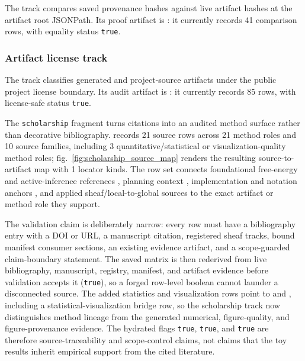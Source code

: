 \documentclass[
  english,
]{article}
\begin{document}
The  track compares saved provenance hashes
against live artifact hashes at the artifact root JSONPath. Its proof
artifact is : it
currently records 41 comparison rows, with equality status
\texttt{true}.

\subsubsection{Artifact license track}\label{artifact-license-track}

The  track classifies generated and
project-source artifacts under the public project license boundary. Its
audit artifact is :
it currently records 85 rows, with license-safe status \texttt{true}.

The \texttt{scholarship} fragment turns citations into an audited method
surface rather than decorative bibliography.
 records 21 source
rows across 21 method roles and 10 source families, including 3
quantitative/statistical or visualization-quality method roles;
fig.~\ref{fig:scholarship_source_map} renders the resulting
source-to-artifact map with 1 locator kinds. The row set connects
foundational free-energy and active-inference references
\citep{friston2010fep, buckley2017mathreview, dacosta2020discrete, parr2022active, smith2022tutorial},
planning context \citep{champion2021branching, nuijten2026efeplanning},
implementation and notation anchors \citep{pymdp2024, gnn2023}, and
applied sheaf/local-to-global sources
\citep{curry2014sheaves, robinson2014topological, bosca2026localglobal}
to the exact artifact or method role they support.

The validation claim is deliberately narrow: every row must have a
bibliography entry with a DOI or URL, a manuscript citation, registered
sheaf tracks, bound manifest consumer sections, an existing evidence
artifact, and a scope-guarded claim-boundary statement. The saved matrix
is then rederived from live bibliography, manuscript, registry,
manifest, and artifact evidence before validation accepts it
(\texttt{true}), so a forged row-level boolean cannot launder a
disconnected source. The added statistics and visualization rows point
to  and
, including a
statistical-visualization bridge row, so the scholarship track now
distinguishes method lineage from the generated numerical,
figure-quality, and figure-provenance evidence. The hydrated flags
\texttt{true}, \texttt{true}, and \texttt{true} are therefore
source-traceability and scope-control claims, not claims that the toy
results inherit empirical support from the cited literature.
\end{document}
